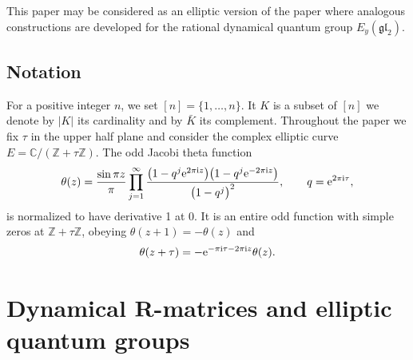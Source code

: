 \documentclass[10pt,a4paper]{amsart}
\numberwithin{equation}{section}
\begin{document}
This paper may be considered as an elliptic version of the paper \cite{RV2} where analogous constructions are developed for the rational dynamical quantum group $E_y(\mathfrak{gl}_2)$.

\subsection*{Notation} For a positive integer $n$, we set $[n]=\{1,\dots,n\}$. It $K$ is a subset of $[n]$ we denote by $|K|$ its cardinality and by $\bar K$ its complement. Throughout the paper we fix $\tau$ in the upper half plane and consider the complex elliptic curve $E=\mathbb C/(\mathbb Z+\tau \mathbb Z)$. The odd Jacobi theta function
\begin{gather}\label{e-theta}
 \theta(z)=\frac{\sin \pi z}{\pi}\prod_{j=1}^\infty\frac{\big(1-q^j{\rm e}^{2\pi{\rm i}z}\big)\big(1-q^j{\rm e}^{-2\pi{\rm i}z}\big)}{\big(1-q^j\big)^2},\qquad q={\rm e}^{2\pi{\rm i}\tau},
\end{gather}
is normalized to have derivative 1 at $0$. It is an entire odd function with simple zeros at $\mathbb Z+\tau\mathbb Z$, obeying $\theta(z+1)=-\theta(z)$ and
\begin{gather*}
 \theta(z+\tau)=-{\rm e}^{-\pi {\rm i}\tau-2\pi{\rm i}z}\theta(z).
\end{gather*}

\section[Dynamical $R$-matrices and elliptic quantum groups]{Dynamical $\boldsymbol{R}$-matrices and elliptic quantum groups}\label{s-2}
\end{document}
